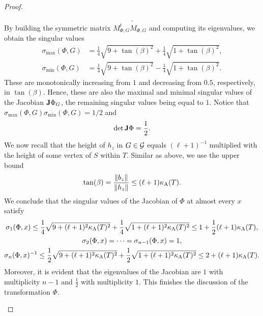 \documentclass[10pt,a4paper]{article}
\begin{document}
\begin{proof}
\begin{itemize}
\begin{align*}
            .
        \end{align*}
        By building the symmetric matrix $M_{\Phi,G}^{t} M_{\Phi,G}$ and computing its eigenvalues, 
        we obtain the singular values 
        \begin{align*}
            \sigma_{\max}(\Phi,G) 
            &
            =
            \frac{1}{4} \sqrt{ 9 + \tan(\beta)^2 } + \frac{1}{4} \sqrt{ 1 + \tan(\beta)^2 } 
            ,
            \\
            \sigma_{\min}(\Phi,G) 
            &
            =
            \frac{1}{4} \sqrt{ 9 + \tan(\beta)^2 } - \frac{1}{4} \sqrt{ 1 + \tan(\beta)^2 } 
            .
        \end{align*}
        These are monotonically increasing from $1$ and decreasing from $0.5$, respectively, in $\tan(\beta)$. 
        Hence, these are also the maximal and minimal singular values of the Jacobian ${\mathbf{J}} \Phi_{G}$, the remaining singular values being equal to $1$. 
        Notice that $\sigma_{\max}(\Phi,G) \sigma_{\min}(\Phi,G) = 1/2$ and 
        \begin{align*}
            \det {\mathbf{J}}\Phi = \frac 1 2.
        \end{align*}
        We now recall that the height of $h_{z}$ in $G \in {\mathcal G}$ equals $(\ell+1)^{-1}$ multiplied with the height of some vertex of $S$ within $T$.
        Similar as above, we use the upper bound 
        \begin{align*}
            \tan(\beta) = \frac{\|  b_{z}  \|}{\|  h_{z}  \|} \leq (\ell+1) \kappa_{\rm A}(T).
        \end{align*}
        We conclude that the singular values of the Jacobian of $\Phi$ at almost every $x$ satisfy 
        \begin{gather}
            \sigma_{1}(\Phi,x) %
            \leq 
            \frac 1 4 \sqrt{ 9 + (\ell+1)^2 \aspectratio(T)^2 } + \frac 1 4 \sqrt{ 1 + (\ell+1)^2 \aspectratio(T)^2 }
            \leq 
            1 + \frac{1}{2} (\ell+1) \aspectratio(T) 
            \label{math:phi_max}
            ,
            \\
            \sigma_{2}(\Phi,x) = \dots = \sigma_{n-1}(\Phi,x) = 1,
            \\
            \sigma_{n}(\Phi,x)^{-1} %
            \leq 
            \frac 1 2 \sqrt{ 9 + (\ell+1)^2 \aspectratio(T)^2 } + \frac 1 2 \sqrt{ 1 + (\ell+1)^2 \aspectratio(T)^2 }
            \leq 
            2 + (\ell+1) \aspectratio(T) 
            \label{math:phi_min}
            .
        \end{gather}
        \color{red}Moreover, it is evident that the eigenvalues of the Jacobian are $1$ with multiplicity $n-1$ and $\tfrac 1 2$ with multiplicity $1$.\color{black}
        This finishes the discussion of the transformation $\Phi$. 
        

\end{itemize}
\end{proof}
\end{document}

